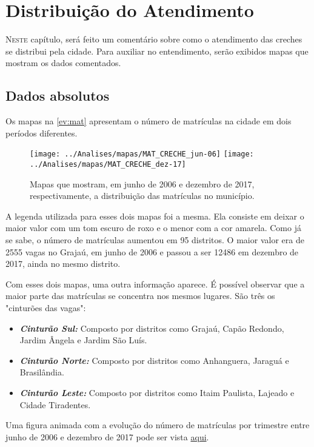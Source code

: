 \chapter{Distribuição do Atendimento}
\label{cap:distribuicao}

\lettrine{N}{este} capítulo, será feito um comentário sobre como o atendimento das creches se distribui pela cidade. Para auxiliar no entendimento, serão exibidos mapas que mostram os dados comentados.

\section{Dados absolutos}

Os mapas na \autoref{ev:mat} apresentam o número de matrículas na cidade em dois períodos diferentes.

\begin{figure}[H]
	\centering
	\texttt{[image: ../Analises/mapas/MAT\_CRECHE\_jun-06]}
	\texttt{[image: ../Analises/mapas/MAT\_CRECHE\_dez-17]}
	\caption{Mapas que mostram, em junho de 2006 e dezembro de 2017, respectivamente, a distribuição das matrículas no município.}
	\label{ev:mat}
\end{figure}

A legenda utilizada para esses dois mapas foi a mesma. Ela consiste em deixar o maior valor com um tom escuro de roxo e o menor com a cor amarela. Como já se sabe, o número de matrículas aumentou em 95 distritos. O maior valor era de 2555 vagas no Grajaú, em junho de 2006 e passou a ser 12486 em dezembro de 2017, ainda no mesmo distrito.

Com esses dois mapas, uma outra informação aparece. É possível observar que a maior parte das matrículas se concentra nos mesmos lugares. São três os "cinturões das vagas": 

\begin{itemize}
	\item \textit{\textbf{Cinturão Sul:}} Composto por distritos como Grajaú, Capão Redondo, Jardim Ângela e Jardim São Luís.
	\item \textit{\textbf{Cinturão Norte:}} Composto por distritos como Anhanguera, Jaraguá e Brasilândia.
	\item \textit{\textbf{Cinturão Leste:}} Composto por distritos como Itaim Paulista, Lajeado e Cidade Tiradentes.
\end{itemize}

Uma figura animada com a evolução do número de matrículas por trimestre entre junho de 2006 e dezembro de 2017 pode ser vista \href{https://lsflp.github.io/MAC0213/multimidia/MAT_CRECHE.gif}{aqui}.

